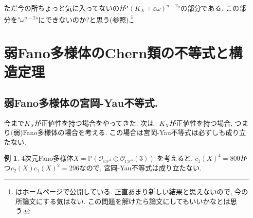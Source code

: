 \documentclass[dvipdfmx]{msjproc}
\theoremstyle{definition}
\newtheorem{exa}[thm]{例}
\newcommand{\C}{\mathbb{C}}
\begin{document}
ただ今の所ちょっと気に入ってないのが"$(K_{X} + \varepsilon \omega)^{n-2}$"の部分である. 
この部分を"$\omega^{n-2}$"にできないのか?と思う(\cite{Iwa25}参照).\footnote{\cite{Iwa25}はホームページで公開している. 正直あまり新しい結果と思えないので, 今の所論文にする気はない. この問題を解けたら論文にしてもいいかなとは思う. }


\section{弱Fano多様体のChern類の不等式と構造定理}

\subsection{弱Fano多様体の宮岡-Yau不等式.}
今まで$K_X$が正値性を持つ場合をやってきた. 
次は$-K_X$が正値性を持つ場合, つまり(弱)Fano多様体の場合を考える. 
この場合は宮岡-Yau不等式は必ずしも成り立たない. 
\begin{exa}\cite[Example 7]{GKP22}
4次元Fano多様体$X = \mathbb{P}(\mathcal{O}_{\C\mathbb{P}^3} \oplus \mathcal{O}_{\C\mathbb{P}^3}(3))$
を考えると, $c_1(X)^4 = 800$かつ$c_2(X)c_1(X)^2=296$なので, 宮岡-Yau不等式は成り立たない. 
\end{exa}
\end{document}
